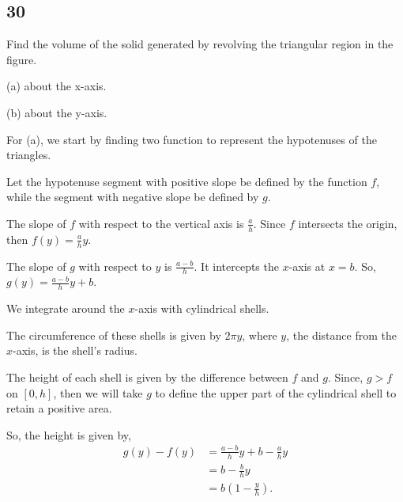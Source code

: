 \documentclass[../hw7.tex]{subfiles}
\begin{document}
\subsection*{30}
Find the volume of the solid generated by revolving the triangular region in the figure. 

\begin{figure*}[ht]
\centering
{}
\end{figure*}

(a) about the x-axis.

(b) about the y-axis.

For (a), we start by finding two function to represent the hypotenuses of the triangles.

Let the hypotenuse segment with positive slope be defined by the function $f$, while the segment with negative slope be defined by $g$.

The slope of $f$ with respect to the vertical axis is $\frac{a}{h}$. Since $f$ intersects the origin, then $f(y) = \frac{a}{h}y$.

The slope of $g$ with respect to $y$ is $\frac{a-b}{h}$. It intercepts the $x$-axis at $x=b$. So, $g(y)=\frac{a-b}{h}y+b$.

We integrate around the $x$-axis with cylindrical shells. 

The circumference of these shells is given by $2\pi y$, where $y$, the distance from the $x$-axis, is the shell's radius. 

The height of each shell is given by the difference between $f$ and $g$. Since, $g>f$ on $[0,h]$, then we will take $g$ to define the upper part of the cylindrical shell to retain a positive area.

So, the height is given by,
\begin{align*}
    g(y)-f(y) &= \frac{a-b}{h}y+b-\frac{a}{h}y \\
    &= b - \frac{b}{h}y \\
    &= b\left( 1-\frac{y}{h} \right).
\end{align*}
\end{document}
